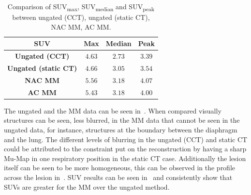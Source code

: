             \begin{table}
                \centering
                
                \captionsetup{singlelinecheck=false}
                \caption{
                    Comparison of \gls{SUV}\textsubscript{max}, \gls{SUV}\textsubscript{median} and \gls{SUV}\textsubscript{peak} between ungated (\gls{CCT}), ungated (static \gls{CT}), \gls{NAC} \gls{MM}, \gls{AC} \gls{MM}.
                }
                
                \resizebox*{1.0\linewidth}{!}
                {
                    \begin{tabular}{||c|ccc||}
                        \hline
                        \textbf{\gls{SUV}}                  & \textbf{Max}  & \textbf{Median}   & \textbf{Peak} \\
                        \hline
                        \textbf{Ungated (\gls{CCT})}        & $4.63$        & $2.73$                     & $3.39$ \\
                        \textbf{Ungated (static \gls{CT})}  & $4.66$        & $3.05$                     & $3.54$ \\
                        \hline
                        \textbf{\gls{NAC} \gls{MM}}         & $5.56$        & $3.18$                     & $4.07$ \\
                        \textbf{\gls{AC} \gls{MM}}          & $5.43$        & $3.18$                     & $4.00$ \\
                        \hline
                    \end{tabular}
                }
                \label{tab:pet_ct_respiratory_motion_correction_with_a_single_attenuation_map_using_nAC_derived_deformation_fields_results_suv}
            \end{table}
            
             The ungated and the \gls{MM} data can be seen in~. When compared visually structures can be seen, less blurred, in the \gls{MM} data that cannot be seen in the ungated data, for instance, structures at the boundary between the diaphragm and the lung. The different levels of blurring in the ungated (\gls{CCT}) and static \gls{CT} could be attributed to the constraint put on the reconstruction by having a sharp \gls{Mu-Map} in one respiratory position in the static \gls{CT} case. Additionally the lesion itself can be seen to be more homogeneous, this can be observed in the profile across the lesion in~. \gls{SUV} results can be seen in~ and consistently show that \glspl{SUV} are greater for the \gls{MM} over the ungated method.
            
